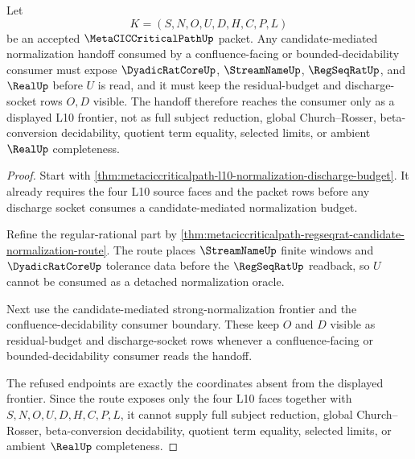 \begin{theorem}
\label{thm:metacic-critical-path-normalization-frontier-handoff}
Let
$$
K=(S,N,O,U,D,H,C,P,L)
$$
be an accepted $\MetaCICCriticalPathUp$ packet. Any candidate-mediated normalization handoff consumed by a confluence-facing or bounded-decidability consumer must expose $\DyadicRatCoreUp$, $\StreamNameUp$, $\RegSeqRatUp$, and $\RealUp$ before $U$ is read, and it must keep the residual-budget and discharge-socket rows $O,D$ visible. The handoff therefore reaches the consumer only as a displayed L10 frontier, not as full subject reduction, global Church--Rosser, beta-conversion decidability, quotient term equality, selected limits, or ambient $\RealUp$ completeness.
\end{theorem}
\begin{proof}
Start with \autoref{thm:metaciccriticalpath-l10-normalization-discharge-budget}. It already requires the four L10 source faces and the packet rows before any discharge socket consumes a candidate-mediated normalization budget.

Refine the regular-rational part by \autoref{thm:metaciccriticalpath-regseqrat-candidate-normalization-route}. The route places $\StreamNameUp$ finite windows and $\DyadicRatCoreUp$ tolerance data before the $\RegSeqRatUp$ readback, so $U$ cannot be consumed as a detached normalization oracle.

Next use the candidate-mediated strong-normalization frontier and the confluence-decidability consumer boundary. These keep $O$ and $D$ visible as residual-budget and discharge-socket rows whenever a confluence-facing or bounded-decidability consumer reads the handoff.

The refused endpoints are exactly the coordinates absent from the displayed frontier. Since the route exposes only the four L10 faces together with $S,N,O,U,D,H,C,P,L$, it cannot supply full subject reduction, global Church--Rosser, beta-conversion decidability, quotient term equality, selected limits, or ambient $\RealUp$ completeness.
\end{proof}

